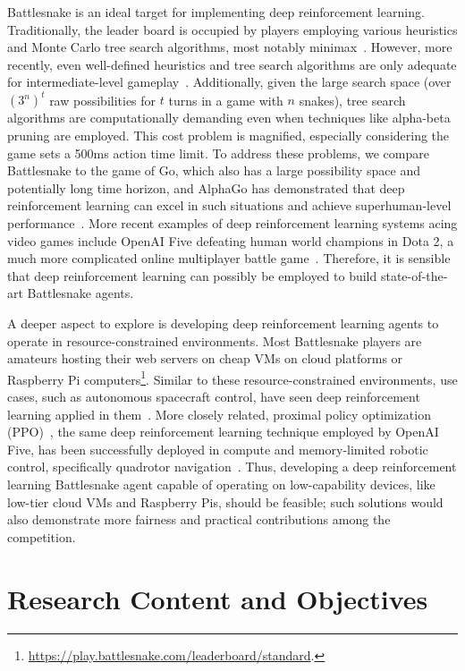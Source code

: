 \documentclass[a4paper]{article}
\begin{document}
Battlesnake is an ideal target for implementing deep reinforcement learning.
Traditionally,
the leader board is occupied by players employing various heuristics and Monte
Carlo tree search algorithms,
most notably minimax~\cite{hill2018building,binnersley2020battlesnake}. However,
more recently,
even well-defined heuristics and tree search algorithms are only adequate for
intermediate-level gameplay~\cite{schier2019adversarial}. Additionally,
given the large search space (over $(3^n)^t$ raw possibilities for $t$ turns in
a game with $n$ snakes),
tree search algorithms are computationally demanding even when techniques like
alpha-beta pruning are employed. This cost problem is magnified,
especially considering the game sets a 500ms action time limit.
To address these problems, we compare Battlesnake to the game of Go,
which also has a large possibility space and potentially long time horizon,
and AlphaGo has demonstrated that deep reinforcement learning can excel in such
situations and achieve superhuman-level performance~\cite{silver2016mastering}.
More recent examples of deep reinforcement learning systems acing video games
include OpenAI Five defeating human world champions in Dota 2,
a much more complicated online multiplayer battle game~\cite{berner2019dota}.
Therefore,
it is sensible that deep reinforcement learning can possibly be employed to
build state-of-the-art Battlesnake agents.

A deeper aspect to explore is developing deep reinforcement learning agents to
operate in resource-constrained environments.
Most Battlesnake players are amateurs hosting their web servers on cheap VMs on
cloud platforms or Raspberry Pi
computers\footnote{\url{https://play.battlesnake.com/leaderboard/standard}.}.
Similar to these resource-constrained environments, use cases,
such as autonomous spacecraft control,
have seen deep reinforcement learning applied in
them~\cite{harris2022generation}. More closely related,
proximal policy optimization (PPO)~\cite{schulman2017proximal},
the same deep reinforcement learning technique employed by OpenAI Five,
has been successfully deployed in compute and memory-limited robotic control,
specifically quadrotor navigation~\cite{huang2023collision,hegde2023hyperppo}.
Thus,
developing a deep reinforcement learning Battlesnake agent capable of operating
on low-capability devices,
like low-tier cloud VMs and Raspberry Pis, should be feasible;
such solutions would also demonstrate more fairness and practical contributions
among the competition.

\section{Research Content and Objectives}
\end{document}
